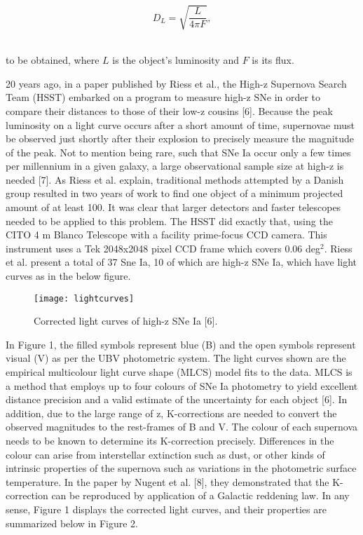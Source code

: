 \documentclass[12pt]{article}
\begin{document}
\begin{equation} 
D_L = \sqrt{\frac{L}{4\pi F}},
\end{equation}
\
	
\noindent to be obtained, where $L$ is the object's luminosity and $F$ is its flux.

20 years ago, in a paper published by Riess et al., the High-z Supernova Search Team (HSST) embarked on a program to measure high-z SNe in order to compare their distances to those of their low-z cousins [6]. Because the peak luminosity on a light curve occurs after a short amount of time, supernovae must be observed just shortly after their explosion to precisely measure the magnitude of the peak. Not to mention being rare, such that SNe Ia occur only a few times per millennium in a given galaxy, a large observational sample size at high-z is needed [7]. As Riess et al. explain, traditional methods attempted by a Danish group resulted in two years of work to find one object of a minimum projected amount of at least 100. It was clear that larger detectors and faster telescopes needed to be applied to this problem. The HSST did exactly that, using the CITO 4 m Blanco Telescope with a facility prime-focus CCD camera. This instrument uses a Tek 2048x2048 pixel CCD frame which covers 0.06 deg$^2$. Riess et al. present a total of 37 Sne Ia, 10 of which are high-z SNe Ia, which have light curves as in the below figure.

\begin{figure}[h]
    \centering
    \texttt{[image: lightcurves]}
    \caption{Corrected light curves of high-z SNe Ia [6].}
    \label{fig:mesh1}
\end{figure}

In Figure 1, the filled symbols represent blue (B) and the open symbols represent visual (V) as per the UBV photometric system. The light curves shown are the empirical multicolour light curve shape (MLCS) model fits to the data. MLCS is a method that employs up to four colours of SNe Ia photometry to yield excellent distance precision and a valid estimate of the uncertainty for each object [6]. In addition, due to the large range of z, K-corrections are needed to convert the observed magnitudes to the rest-frames of B and V. The colour of each supernova needs to be known to determine its K-correction precisely. Differences in the colour can arise from interstellar extinction such as dust, or other kinds of intrinsic properties of the supernova such as variations in the photometric surface temperature. In the paper by Nugent et al. [8], they demonstrated that the K-correction can be reproduced by application of a Galactic reddening law. In any sense, Figure 1 displays the corrected light curves, and their properties are summarized below in Figure 2.
\end{document}

